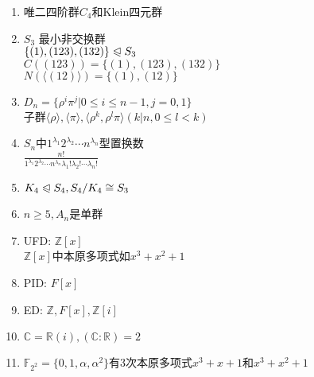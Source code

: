 \documentclass[a4paper,10pt]{ctexart}
\newcommand*{\bb}[1]{\mathbb{#1}}
\newcommand*{\setZ}{\mathbb{Z}}
\newcommand*{\setR}{\mathbb{R}}
\newcommand*{\setC}{\mathbb{C}}
\renewcommand*{\leq}{\leqslant}
\renewcommand*{\geq}{\geqslant}
\newcommand*{\nmsubgroupeq}{\trianglelefteqslant}
\newcommand*{\gengroup}[1]{\langle #1 \rangle}
\newcommand*{\ff}[1]{\bb{F}_{#1}}
\begin{document}
\begin{multicols}{3}
    \begin{enumerate}
        \item 唯二四阶群$C_4$和Klein四元群
        \item $S_3$ 最小非交换群\\
              $\{(1), (123), (132)\} \nmsubgroupeq S_3$ \\
              $C((123)) = \{ (1), (123), (132) \}$ \\
              $N(\gengroup{(12)}) = \{ (1), (12) \}$
        \item $D_n = \{\rho^i \pi^j | 0 \leq i \leq n - 1, j = 0, 1 \}$ \\
              子群$\gengroup{\rho}, \gengroup{\pi}, \gengroup{\rho^k, \rho^l\pi} (k | n, 0 \!\leq\! l \!<\! k)$
        \item $S_n$中$1^{\lambda_1} 2^{\lambda_2}\cdots n^{\lambda_n}$型置换数\\
              $\frac{n!}{1^{\lambda_1} 2^{\lambda_2}\cdots n^{\lambda_n} \lambda_1! \lambda_2! \cdots \lambda_n!}$
        \item $K_4 \nmsubgroupeq S_4, S_4/K_4 \cong S_3$
        \item $n \geq 5, A_n$是单群
        \item UFD: $\setZ[x]$\\
              $\setZ[x]$中本原多项式如$x^3 + x^2 + 1$
        \item PID: $F[x]$
        \item ED: $\setZ, F[x], \setZ[i]$
        \item $\setC = \setR(i), (\setC : \setR) = 2$
        \item $\ff{2^2} \! = \! \{ 0, 1, \alpha, \alpha^2 \}$有3次本原多项式$x^3 + x + 1$和$x^3 + x^2 + 1$
    \end{enumerate}

\end{multicols}
\end{document}
